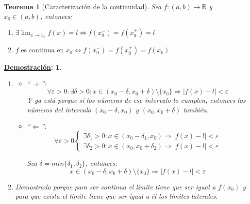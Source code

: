 \documentclass[10pt,a4paper,openright]{book}
\theoremstyle{break}
\newtheorem*{theo}{Teorema}
\newtheorem*{demo}{\underline{Demostración}:}
\begin{document}
\begin{theo}[Caracterización de la continuidad]
Sea $f: (a,b)\longrightarrow \mathbb R$ y $x_0\in (a,b)$, entonces:
\begin{enumerate}
\item $\exists \lim_{x\rightarrow x_0} f(x)=l\Leftrightarrow f(x_0^-)=f(x_0^+)=l$

\item $f \mbox{ es continua en }x_0 \Leftrightarrow f(x_0^-)=f(x_0^+)=f(x_0)$
\end{enumerate}
\end{theo}
\begin{demo}
\begin{enumerate}
\item 
	\begin{itemize}
	\item ``$\Rightarrow $'':
	$$\forall\varepsilon>0: \exists \delta>0: x\in (x_0-\delta, x_0+\delta)\mbox{\textbackslash}\{x_0\}\Rightarrow |f(x)-l|<\varepsilon$$
	Y ya está porque si los números de ese intervalo lo cumplen, entonces los números del intervalo $(x_0-\delta, x_0)$ y $(x_0, x_0+\delta)$ también.
	
	\item ``$\Leftarrow$'':
	$$\forall \varepsilon>0\begin{cases}\exists \delta_1>0: x\in (x_0-\delta_1, x_0)\Rightarrow |f(x)-l|<\varepsilon \\
	\exists \delta_2>0: x\in (x_0,x_0+\delta_2)\Rightarrow |f(x)-l|<\varepsilon\end{cases}$$
	
 	Sea $\delta =min\{ \delta_1, \delta_2\}$, entonces:
	$$x\in (x_0-\delta, x_0+\delta)\mbox{\textbackslash}\{x_0\}\Rightarrow |f(x)-l|<\varepsilon$$
	\end{itemize}
	
\item Demostrado porque para ser continua el límite tiene que ser igual a $f(x_0)$ y para que exista el límite tiene que ser igual a él los límites laterales.
\end{enumerate}
\end{demo}
\end{document}
